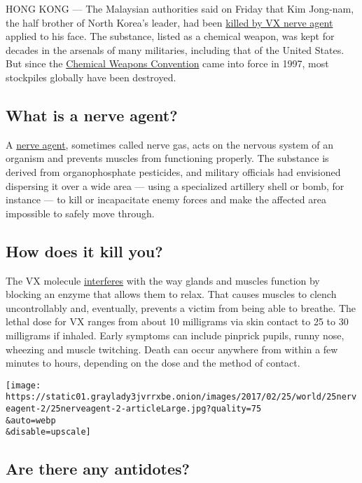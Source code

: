HONG KONG --- The Malaysian authorities said on Friday that Kim
Jong-nam, the half brother of North Korea's leader, had been
\href{https://www.nytimes3xbfgragh.onion/2017/02/23/world/asia/kim-jong-nam-vx-nerve-agent-.html}{killed
by VX nerve agent} applied to his face. The substance, listed as a
chemical weapon, was kept for decades in the arsenals of many
militaries, including that of the United States. But since the
\href{https://www.opcw.org/chemical-weapons-convention/}{Chemical
Weapons Convention} came into force in 1997, most stockpiles globally
have been destroyed.

\hypertarget{what-is-a-nerve-agent}{%
\subsection{What is a nerve agent?}\label{what-is-a-nerve-agent}}

A \href{https://fas.org/programs/bio/chemweapons/cwagents.html}{nerve
agent}, sometimes called nerve gas, acts on the nervous system of an
organism and prevents muscles from functioning properly. The substance
is derived from organophosphate pesticides, and military officials had
envisioned dispersing it over a wide area --- using a specialized
artillery shell or bomb, for instance --- to kill or incapacitate enemy
forces and make the affected area impossible to safely move through.

\hypertarget{how-does-it-kill-you}{%
\subsection{How does it kill you?}\label{how-does-it-kill-you}}

The VX molecule
\href{https://emergency.cdc.gov/agent/vx/basics/facts.asp}{interferes}
with the way glands and muscles function by blocking an enzyme that
allows them to relax. That causes muscles to clench uncontrollably and,
eventually, prevents a victim from being able to breathe. The lethal
dose for VX ranges from about 10 milligrams via skin contact to 25 to 30
milligrams if inhaled. Early symptoms can include pinprick pupils, runny
nose, wheezing and muscle twitching. Death can occur anywhere from
within a few minutes to hours, depending on the dose and the method of
contact.

\texttt{[image: https://static01.graylady3jvrrxbe.onion/images/2017/02/25/world/25nerveagent-2/25nerveagent-2-articleLarge.jpg?quality=75\\\&auto=webp\\\&disable=upscale]}

\hypertarget{are-there-any-antidotes}{%
\subsection{Are there any antidotes?}\label{are-there-any-antidotes}}

